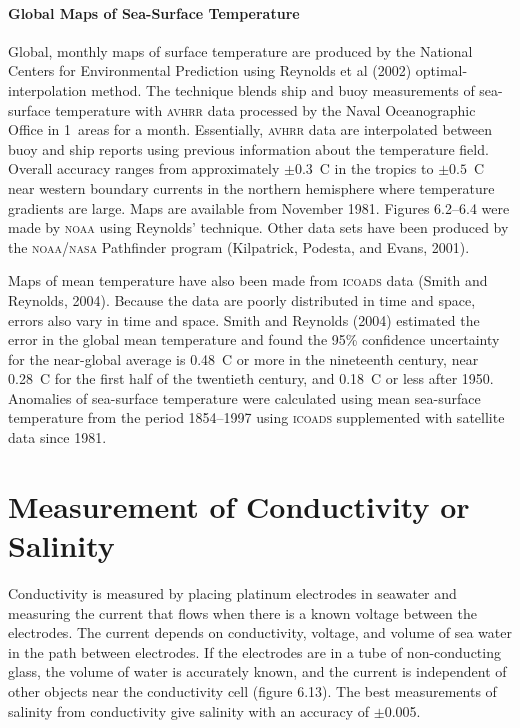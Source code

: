\paragraph{Global Maps of Sea-Surface Temperature} Global, monthly maps of surface temperature are produced by the National Centers for Environmental Prediction using Reynolds et al (2002) optimal-interpolation method. The technique blends ship and buoy measurements of sea-surface temperature with \textsc{avhrr} data processed by the Naval Oceanographic Office in 1\degrees\ areas for a month. Essentially, \textsc{avhrr} data are interpolated between buoy and ship reports using previous information about the temperature field. Overall accuracy ranges from approximately $\pm 0.3$\degrees\ C in the tropics to  $\pm 0.5$\degrees\ C near western boundary currents in the northern hemisphere where temperature gradients are large.
Maps are available from November 1981. Figures 6.2--6.4 were made by \textsc{noaa} using Reynolds' technique. Other data sets have been produced by the \textsc{noaa/nasa} Pathfinder program (Kilpatrick, Podesta, and Evans, 2001).

Maps of mean temperature have also been made from \textsc{icoads} data (Smith and Reynolds, 2004). Because the data are poorly distributed in time and space, errors also vary in time and space. Smith and Reynolds (2004) estimated the error in the global mean temperature and found the 95\% confidence uncertainty for the near-global average is 0.48\degrees\ C or more in the nineteenth century, near 0.28\degrees\ C for the first half of the twentieth century, and 0.18\degrees\ C or less after 1950. Anomalies of sea-surface temperature were calculated using mean sea-surface temperature from the period 1854--1997 using \textsc{icoads} supplemented with satellite data since 1981.

\section{Measurement of Conductivity or Salinity}
Conductivity is measured by placing platinum electrodes in
seawater and measuring the current that flows when there is a known voltage between
the electrodes. The current depends on conductivity, voltage,
and volume of sea water in the path between electrodes. If the electrodes are in a tube of
non-conducting glass, the volume of water is accurately known, and the current is independent
of other objects near the conductivity cell (figure 6.13). The best measurements of salinity
from conductivity give salinity with an accuracy of
$\pm$0.005.

